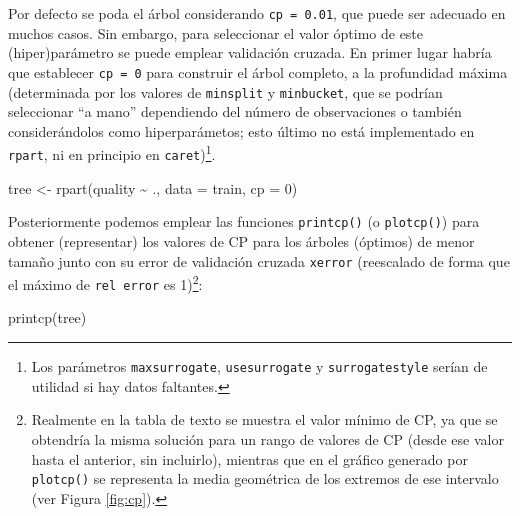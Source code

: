 \documentclass[
  spanish,
]{book}
\newenvironment{Shaded}{\begin{snugshade}}{\end{snugshade}}
\newcommand{\AttributeTok}[1]{\textcolor[rgb]{0.77,0.63,0.00}{#1}}
\newcommand{\DecValTok}[1]{\textcolor[rgb]{0.00,0.00,0.81}{#1}}
\newcommand{\FunctionTok}[1]{\textcolor[rgb]{0.00,0.00,0.00}{#1}}
\newcommand{\NormalTok}[1]{#1}
\newcommand{\OtherTok}[1]{\textcolor[rgb]{0.56,0.35,0.01}{#1}}
\newcommand{\SpecialCharTok}[1]{\textcolor[rgb]{0.00,0.00,0.00}{#1}}
\theoremstyle{break}
\theoremstyle{definition}
\theoremstyle{definition}
\theoremstyle{definition}
\theoremstyle{definition}
\theoremstyle{remark}
\begin{document}
Por defecto se poda el árbol considerando \texttt{cp\ =\ 0.01}, que puede ser adecuado en muchos casos.
Sin embargo, para seleccionar el valor óptimo de este (hiper)parámetro se puede emplear validación cruzada.
En primer lugar habría que establecer \texttt{cp\ =\ 0} para construir el árbol completo, a la profundidad máxima
(determinada por los valores de \texttt{minsplit} y \texttt{minbucket}, que se podrían seleccionar
``a mano'' dependiendo del número de observaciones o también considerándolos como hiperparámetos; esto último no está implementado en \texttt{rpart}, ni en principio en \texttt{caret})\footnote{Los parámetros \texttt{maxsurrogate}, \texttt{usesurrogate} y \texttt{surrogatestyle} serían de utilidad si hay datos faltantes.}.

\begin{Shaded}
\begin{Highlighting}[]
\NormalTok{tree }\OtherTok{\textless{}{-}} \FunctionTok{rpart}\NormalTok{(quality }\SpecialCharTok{\textasciitilde{}}\NormalTok{ ., }\AttributeTok{data =}\NormalTok{ train, }\AttributeTok{cp =} \DecValTok{0}\NormalTok{)}
\end{Highlighting}
\end{Shaded}

Posteriormente podemos emplear las funciones \texttt{printcp()} (o \texttt{plotcp()}) para obtener (representar)
los valores de CP para los árboles (óptimos) de menor tamaño junto con su error de validación cruzada
\texttt{xerror} (reescalado de forma que el máximo de \texttt{rel\ error} es 1)\footnote{Realmente en la tabla de texto se muestra el valor mínimo de CP, ya que se obtendría la misma solución para un rango de valores de CP (desde ese valor hasta el anterior, sin incluirlo), mientras que en el gráfico generado por \texttt{plotcp()} se representa la media geométrica de los extremos de ese intervalo (ver Figura \ref{fig:cp}).}:

\begin{Shaded}
\begin{Highlighting}[]
\FunctionTok{printcp}\NormalTok{(tree)}
\end{Highlighting}
\end{Shaded}
\end{document}

